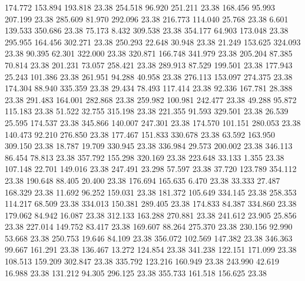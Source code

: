  174.772  153.894  193.818        23.38
 254.518   96.920  251.211        23.38
 168.456   95.993  207.199        23.38
 285.609   81.970  292.096        23.38
 216.773  114.040   25.768        23.38
   6.601  139.533  350.686        23.38
  75.173    8.432  309.538        23.38
 354.177   64.903  173.048        23.38
 295.955  164.456  302.271        23.38
 250.293   22.648   30.948        23.38
  21.249  153.625  324.093        23.38
  90.395   62.301  322.000        23.38
 320.871  166.748  341.979        23.38
 205.204   87.385   70.814        23.38
 201.231   73.057  258.421        23.38
 289.913   87.529  199.501        23.38
 177.943   25.243  101.386        23.38
 261.951   94.288   40.958        23.38
 276.113  153.097  274.375        23.38
 174.304   88.940  335.359        23.38
  29.434   78.493  117.414        23.38
  92.336  167.781   28.388        23.38
 291.483  164.001  282.868        23.38
 259.982  100.981  242.477        23.38
  49.288   95.872  115.183        23.38
  51.522   32.755  315.198        23.38
 221.355   91.593  329.501        23.38
  26.539   25.595  174.537        23.38
 345.866  140.007  247.301        23.38
 174.570  101.151  280.053        23.38
 140.473   92.210  276.850        23.38
 177.467  151.833  330.678        23.38
  63.592  163.950  309.150        23.38
  18.787   19.709  330.945        23.38
 336.984   29.573  200.002        23.38
 346.113   86.454   78.813        23.38
 357.792  155.298  320.169        23.38
 223.648   33.133    1.355        23.38
 107.148   22.701  149.016        23.38
 247.491   23.298   57.597        23.38
  37.720  123.789  354.112        23.38
 190.648   88.405   20.400        23.38
 176.694  165.635    6.470        23.38
  33.333   27.487  168.329        23.38
  11.692   96.252  159.031        23.38
 181.372  105.649  334.145        23.38
 258.353  114.217   68.509        23.38
 334.013  150.381  289.405        23.38
 174.833   84.387  334.860        23.38
 179.062   84.942   16.087        23.38
 312.133  163.288  270.881        23.38
 241.612   23.905   25.856        23.38
 227.014  149.752   83.417        23.38
 169.607   88.264  275.370        23.38
 230.156   92.990   53.668        23.38
 250.753   19.646   84.109        23.38
 356.072  102.569  147.382        23.38
 346.363   99.667  161.291        23.38
 136.467   13.272  124.854        23.38
 341.238  122.151  171.099        23.38
 108.513  159.209  302.847        23.38
 335.792  123.216  160.949        23.38
 243.990   42.619   16.988        23.38
 131.212   94.305  296.125        23.38
 355.733  161.518  156.625        23.38
